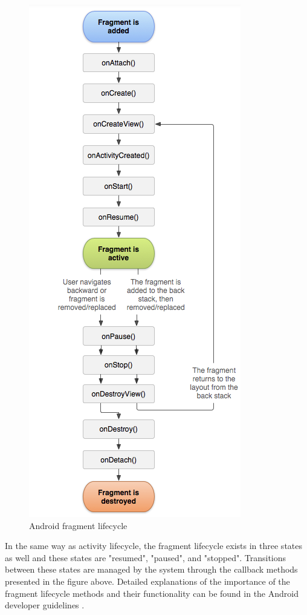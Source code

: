 \begin{figure}[ht!]
    \centering
    \includegraphics[scale=0.4]{figures/fragment_life_cycle.png}
    \caption{Android fragment lifecycle \protect\cite{9}}
    \label{fig:android_fragment_life_cycle}
\end{figure}

In the same way as activity lifecycle, the fragment lifecycle exists in three states as well and these states are "resumed", "paused", and "stopped". Transitions between these states are managed by the system through the callback methods presented in the figure above. Detailed explanations of the importance of the fragment lifecycle methods and their functionality can be found in the Android developer guidelines \cite{9}.